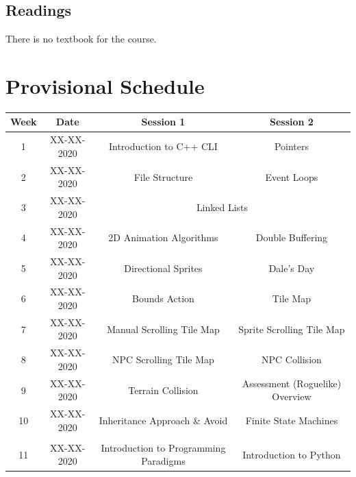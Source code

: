 \documentclass{article}
\begin{document}
\subsection*{Readings}
There is no textbook for the course.

\section*{Provisional Schedule}

\renewcommand{\arraystretch}{1.5}
\begin{tabular}{|c|c|c|c|}
	\hline
	\textbf{Week} & \textbf{Date} & \textbf{Session 1}                    & \textbf{Session 2}                         \\ \hline
	1             & XX-XX-2020    & Introduction to C++ CLI               & Pointers                                   \\ \hline
	2             & XX-XX-2020    & File Structure                        & Event Loops                                \\ \hline
	3             & XX-XX-2020    & \multicolumn{2}{c|}{Linked Lists}                                                  \\ \hline
	4             & XX-XX-2020    & 2D Animation Algorithms               & Double Buffering                           \\ \hline
	5             & XX-XX-2020    & Directional Sprites                   & \cellcolor{yellow} Dale's Day              \\ \hline
	6             & XX-XX-2020    & Bounds Action                         & Tile Map                                   \\ \hline
	7             & XX-XX-2020    & Manual Scrolling Tile Map             & Sprite Scrolling Tile Map                  \\ \hline
	8             & XX-XX-2020    & NPC Scrolling Tile Map                & NPC Collision                              \\ \hline
	9             & XX-XX-2020    & Terrain Collision                     & Assessment (Roguelike) Overview            \\ \hline
	10            & XX-XX-2020    & Inheritance Approach \& Avoid         & Finite State Machines                      \\ \hline
	\rowcolor{yellow} \multicolumn{4}{|c|}{Mid Term Break}                                                             \\ \hline
	11            & XX-XX-2020    & Introduction to Programming Paradigms & Introduction to Python                     \\ \hline

\end{tabular}
\end{document}
